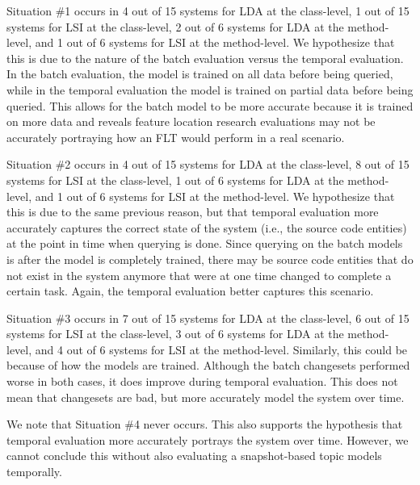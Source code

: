 
Situation \#1 occurs in
4 out of 15 systems for LDA at the class-level,
1 out of 15 systems for LSI at the class-level,
2 out of 6 systems for LDA at the method-level,
and 1 out of 6 systems for LSI at the method-level.
We hypothesize that this is due to the nature of the batch evaluation versus the temporal evaluation.
In the batch evaluation, the model is trained on all data before being queried,
while in the temporal evaluation the model is trained on partial data before being queried.
This allows for the batch model to be more accurate because it is trained on more data
and reveals feature location research evaluations may not be accurately portraying
how an FLT would perform in a real scenario.

%
Situation \#2 occurs in
4 out of 15 systems for LDA at the class-level,
8 out of 15 systems for LSI at the class-level,
1 out of 6 systems for LDA at the method-level,
and 1 out of 6 systems for LSI at the method-level.
We hypothesize that this is due to the same previous reason, but that
temporal evaluation more accurately captures the correct state of the system (i.e., the source code entities)
at the point in time when querying is done.
Since querying on the batch models is after the model is completely trained,
there may be source code entities that do not exist in the system anymore
that were at one time changed to complete a certain task.
Again, the temporal evaluation better captures this scenario.


Situation \#3 occurs in
7 out of 15 systems for LDA at the class-level,
6 out of 15 systems for LSI at the class-level,
3 out of 6 systems for LDA at the method-level,
and 4 out of 6 systems for LSI at the method-level.
Similarly, this could be because of how the models are trained.
Although the batch changesets performed worse in both cases, it does
improve during temporal evaluation.
This does not mean that changesets are bad, but more accurately model
the system over time.

We note that Situation \#4 never occurs.
This also supports the hypothesis that temporal evaluation more accurately portrays the system over time.
However, we cannot conclude this without also evaluating a snapshot-based topic models temporally.
